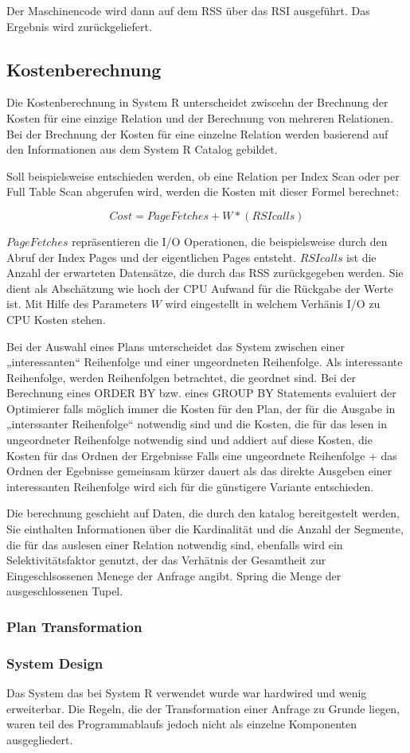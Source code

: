 Der Maschinencode wird dann auf dem \ac{RSS} über das \ac{RSI} ausgeführt.  Das Ergebnis wird zurückgeliefert.

\subsection{Kostenberechnung}

Die Kostenberechnung in System R unterscheidet zwiscehn der Brechnung der Kosten für eine einzige Relation und der Berechnung von mehreren Relationen. Bei der Brechnung der Kosten für eine einzelne Relation werden basierend auf den Informationen aus dem System R Catalog gebildet.

Soll beispielsweise entschieden werden, ob eine Relation per Index Scan oder per Full Table Scan abgerufen wird, werden die Kosten mit dieser Formel berechnet:

$$Cost = Page Fetches + W * (RSI calls)$$


$Page Fetches$ repräsentieren die I/O Operationen, die beispielsweise durch den Abruf der Index Pages und der eigentlichen Pages entsteht. $RSI calls$ ist die Anzahl der erwarteten Datensätze, die durch das \ac{RSS} zurückgegeben werden. Sie dient als Abschätzung wie hoch der CPU Aufwand für die Rückgabe der Werte ist. Mit Hilfe des Parameters $W$ wird eingestellt in welchem Verhänis I/O zu CPU Kosten stehen.

Bei der Auswahl eines Plans unterscheidet das System zwischen einer „interessanten“ Reihenfolge und einer ungeordneten Reihenfolge. Als interessante Reihenfolge, werden Reihenfolgen betrachtet, die geordnet sind. Bei der Berechnung eines ORDER BY bzw. eines GROUP BY Statements evaluiert der Optimierer falls möglich immer die Kosten für den Plan, der für die Ausgabe in „interssanter Reihenfolge“ notwendig sind und die Kosten, die für das lesen in ungeordneter Reihenfolge notwendig sind und addiert auf diese Kosten, die Kosten für das Ordnen der Ergebnisse Falls eine ungeordnete Reihenfolge + das Ordnen der Egebnisse gemeinsam kürzer dauert als das direkte Ausgeben einer interessanten Reihenfolge wird sich für die günstigere Variante entschieden. 

Die berechnung geschieht auf Daten, die durch den katalog bereitgestelt werden, Sie einthalten Informationen über die Kardinalität und die Anzahl der Segmente, die für das auslesen einer Relation notwendig sind, ebenfalls wird ein Selektivitätsfaktor genutzt, der das Verhätnis der Gesamtheit zur Eingeschlsossenen Menege der Anfrage angibt. Spring die Menge der ausgeschlossenen Tupel. 
\subsubsection{Plan Transformation}

\subsubsection{System Design}
Das System das bei System R verwendet wurde war hardwired und wenig erweiterbar. Die Regeln, die der Transformation einer Anfrage zu Grunde liegen, waren teil des Programmablaufs jedoch nicht als einzelne Komponenten ausgegliedert. 